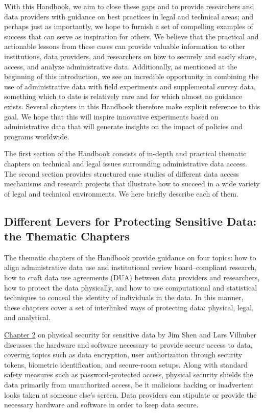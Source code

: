 \documentclass[
]{book}
\begin{document}
With this Handbook, we aim to close these gaps and to provide researchers and data providers with guidance on best practices in legal and technical areas; and perhaps just as importantly, we hope to furnish a set of compelling examples of success that can serve as inspiration for others. We believe that the practical and actionable lessons from these cases can provide valuable information to other institutions, data providers, and researchers on how to securely and easily share, access, and analyze administrative data. Additionally, as mentioned at the beginning of this introduction, we see an incredible opportunity in combining the use of administrative data with field experiments and supplemental survey data, something which to date is relatively rare and for which almost no guidance exists. Several chapters in this Handbook therefore make explicit reference to this goal. We hope that this will inspire innovative experiments based on administrative data that will generate insights on the impact of policies and programs worldwide.

The first section of the Handbook consists of in-depth and practical thematic chapters on technical and legal issues surrounding administrative data access. The second section provides structured case studies of different data access mechanisms and research projects that illustrate how to succeed in a wide variety of legal and technical environments. We here briefly describe each of them.

\hypertarget{different-levers-for-protecting-sensitive-data-the-thematic-chapters}{%
\subsection{Different Levers for Protecting Sensitive Data: the Thematic Chapters}\label{different-levers-for-protecting-sensitive-data-the-thematic-chapters}}

The thematic chapters of the Handbook provide guidance on four topics: how to align administrative data use and institutional review board--compliant research, how to craft data use agreements (DUA) between data providers and researchers, how to protect the data physically, and how to use computational and statistical techniques to conceal the identity of individuals in the data. In this manner, these chapters cover a set of interlinked ways of protecting data: physical, legal, and analytical.

\protect\hyperlink{security}{Chapter 2} on physical security for sensitive data by Jim Shen and Lars Vilhuber discusses the hardware and software necessary to provide secure access to data, covering topics such as data encryption, user authorization through security tokens, biometric identification, and secure-room setups. Along with standard safety measures such as password-protected access, physical security shields the data primarily from unauthorized access, be it malicious hacking or inadvertent looks taken at someone else's screen. Data providers can stipulate or provide the necessary hardware and software in order to keep data secure.
\end{document}
